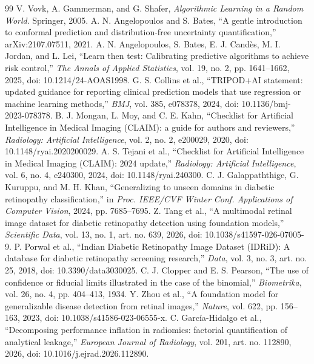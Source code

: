 \documentclass[11pt]{article}
\begin{document}
\begin{thebibliography}{99}
 V. Vovk, A. Gammerman, and G. Shafer, \emph{Algorithmic Learning in a Random World}. Springer, 2005.
 A. N. Angelopoulos and S. Bates, ``A gentle introduction to conformal prediction and distribution-free uncertainty quantification,'' arXiv:2107.07511, 2021.
 A. N. Angelopoulos, S. Bates, E. J. Cand\`es, M. I. Jordan, and L. Lei, ``Learn then test: Calibrating predictive algorithms to achieve risk control,'' \emph{The Annals of Applied Statistics}, vol. 19, no. 2, pp. 1641--1662, 2025, doi: 10.1214/24-AOAS1998.
 G. S. Collins et al., ``TRIPOD+AI statement: updated guidance for reporting clinical prediction models that use regression or machine learning methods,'' \emph{BMJ}, vol. 385, e078378, 2024, doi: 10.1136/bmj-2023-078378.
 B. J. Mongan, L. Moy, and C. E. Kahn, ``Checklist for Artificial Intelligence in Medical Imaging (CLAIM): a guide for authors and reviewers,'' \emph{Radiology: Artificial Intelligence}, vol. 2, no. 2, e200029, 2020, doi: 10.1148/ryai.2020200029.
 A. S. Tejani et al., ``Checklist for Artificial Intelligence in Medical Imaging (CLAIM): 2024 update,'' \emph{Radiology: Artificial Intelligence}, vol. 6, no. 4, e240300, 2024, doi: 10.1148/ryai.240300.
 C. J. Galappaththige, G. Kuruppu, and M. H. Khan, ``Generalizing to unseen domains in diabetic retinopathy classification,'' in \emph{Proc. IEEE/CVF Winter Conf. Applications of Computer Vision}, 2024, pp. 7685--7695.
 Z. Tang et al., ``A multimodal retinal image dataset for diabetic retinopathy detection using foundation models,'' \emph{Scientific Data}, vol. 13, no. 1, art. no. 639, 2026, doi: 10.1038/s41597-026-07005-9.
 P. Porwal et al., ``Indian Diabetic Retinopathy Image Dataset (IDRiD): A database for diabetic retinopathy screening research,'' \emph{Data}, vol. 3, no. 3, art. no. 25, 2018, doi: 10.3390/data3030025.
 C. J. Clopper and E. S. Pearson, ``The use of confidence or fiducial limits illustrated in the case of the binomial,'' \emph{Biometrika}, vol. 26, no. 4, pp. 404--413, 1934.
 Y. Zhou et al., ``A foundation model for generalizable disease detection from retinal images,'' \emph{Nature}, vol. 622, pp. 156--163, 2023, doi: 10.1038/s41586-023-06555-x.
 C. Garc\'ia-Hidalgo et al., ``Decomposing performance inflation in radiomics: factorial quantification of analytical leakage,'' \emph{European Journal of Radiology}, vol. 201, art. no. 112890, 2026, doi: 10.1016/j.ejrad.2026.112890.
\end{thebibliography}
\end{document}
